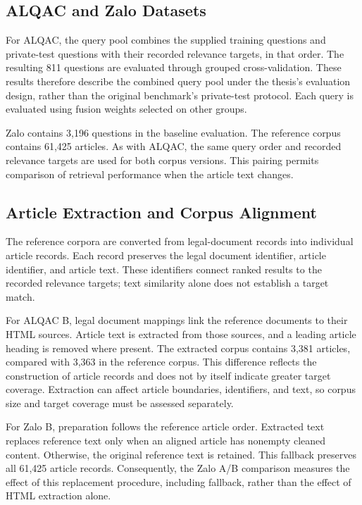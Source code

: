 \subsection{ALQAC and Zalo Datasets}

For ALQAC, the query pool combines the supplied training questions and private-test questions with their recorded relevance targets, in that order. The resulting 811 questions are evaluated through grouped cross-validation. These results therefore describe the combined query pool under the thesis's evaluation design, rather than the original benchmark's private-test protocol. Each query is evaluated using fusion weights selected on other groups.

Zalo contains 3,196 questions in the baseline evaluation. The reference corpus contains 61,425 articles. As with ALQAC, the same query order and recorded relevance targets are used for both corpus versions. This pairing permits comparison of retrieval performance when the article text changes.

\subsection{Article Extraction and Corpus Alignment}

The reference corpora are converted from legal-document records into individual article records. Each record preserves the legal document identifier, article identifier, and article text. These identifiers connect ranked results to the recorded relevance targets; text similarity alone does not establish a target match.

For ALQAC B, legal document mappings link the reference documents to their HTML sources. Article text is extracted from those sources, and a leading article heading is removed where present. The extracted corpus contains 3,381 articles, compared with 3,363 in the reference corpus. This difference reflects the construction of article records and does not by itself indicate greater target coverage. Extraction can affect article boundaries, identifiers, and text, so corpus size and target coverage must be assessed separately.

For Zalo B, preparation follows the reference article order. Extracted text replaces reference text only when an aligned article has nonempty cleaned content. Otherwise, the original reference text is retained. This fallback preserves all 61,425 article records. Consequently, the Zalo A/B comparison measures the effect of this replacement procedure, including fallback, rather than the effect of HTML extraction alone.

